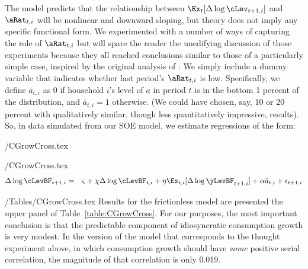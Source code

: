 The model predicts that the relationship between $\Ex_{t}[\Delta \log \cLev_{t+1,i}]$ and $\aRat_{t,i}$ will be nonlinear and downward sloping, but theory does not imply any specific functional form.  We experimented with a number of ways of capturing the role of $\aRat_{t,i}$ but will spare the reader the unedifying discussion of those experiments because they all reached conclusions similar to those of a particularly simple case, inspired by the original analysis of \cite{zeldes:jpe}: We simply include a dummy variable that indicates whether last period's $\aRat_{t,i}$ is low.  Specifically, we define $\bar{a}_{t,i}$ as 0 if household $i$'s level of ${a}$ in period $t$ is in the bottom 1 percent of the distribution, and $\bar{a}_{t,i}=1$ otherwise.  (We could have chosen, say, 10 or 20 percent with qualitatively similar, though less quantitatively impressive, results). So, in data simulated from our SOE model, we estimate regressions of the form: %

\begin{verbatimwrite}{\eq/CGrowCross.tex}
  \newcommand{\CGrowCross}{\Delta \log       \cLevBF _{t+1,i}  &=&  \varsigma + \chi \Delta \log      \cLevBF _{t,i} + \eta     {\Ex}_{t,i}[\Delta \log       \yLevBF _{t+1,i}]+ {\alpha} \bar{a}_{t,i}+\epsilon_{t+1,i}}
  \newcommand{\CGrowCrossBar}{\Delta \log  \perc{\cLevBF}_{t+1,i}  &=&  \varsigma + \chi \Delta \log \perc{\cLevBF}_{t,i} + \eta     {\Ex}_{t,i}[\Delta \log \perc{\yLevBF}_{t+1,i}] + {\alpha} {\perc{a}}_{t,i}+\epsilon_{t+1,i}}
\end{verbatimwrite}
 \eq/CGrowCross.tex
\begin{eqnarray*}
  \CGrowCross
\end{eqnarray*}

\econtexRoot/Tables/CGrowCross.tex
Results for the frictionless model are presented the upper panel of Table~\ref{table:CGrowCross}.
For our purposes, the most important conclusion is that the predictable component of idiosyncratic consumption growth is very modest.  In the version of the model that corresponds to the thought experiment above, in which consumption growth should have {\it some} positive serial correlation, the magnitude of that correlation is only 0.019. %

